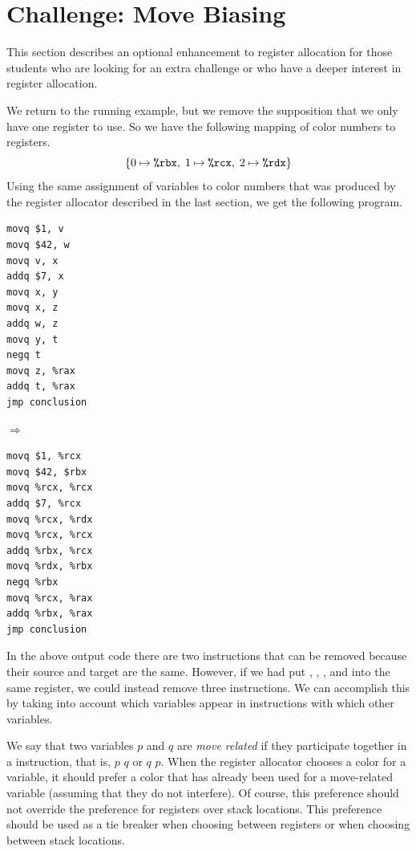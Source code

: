 \documentclass[11pt]{book}
\begin{document}
\section{Challenge: Move Biasing}
\label{sec:move-biasing}

This section describes an optional enhancement to register allocation
for those students who are looking for an extra challenge or who have
a deeper interest in register allocation.

We return to the running example, but we remove the supposition that
we only have one register to use. So we have the following mapping of
color numbers to registers.
\[
  \{ 0 \mapsto \texttt{\%rbx}, \; 1 \mapsto \texttt{\%rcx}, \; 2 \mapsto \texttt{\%rdx} \}
\]
Using the same assignment of variables to color numbers that was
produced by the register allocator described in the last section, we
get the following program.

\begin{minipage}{0.3\textwidth}
\begin{lstlisting}
movq $1, v
movq $42, w
movq v, x
addq $7, x
movq x, y
movq x, z
addq w, z
movq y, t
negq t
movq z, %rax
addq t, %rax
jmp conclusion
\end{lstlisting}
\end{minipage}
$\Rightarrow\qquad$
\begin{minipage}{0.45\textwidth}
\begin{lstlisting}
movq $1, %rcx
movq $42, $rbx
movq %rcx, %rcx
addq $7, %rcx
movq %rcx, %rdx
movq %rcx, %rcx
addq %rbx, %rcx
movq %rdx, %rbx
negq %rbx
movq %rcx, %rax
addq %rbx, %rax
jmp conclusion
\end{lstlisting}
\end{minipage}

In the above output code there are two  instructions that
can be removed because their source and target are the same.  However,
if we had put , , , and  into the same
register, we could instead remove three  instructions.  We
can accomplish this by taking into account which variables appear in
 instructions with which other variables.

We say that two variables $p$ and $q$ are \emph{move related} if they
participate together in a  instruction, that is, 
$p$\key{,} $q$ or  $q$\key{,} $p$. When the register
allocator chooses a color for a variable, it should prefer a color
that has already been used for a move-related variable (assuming that
they do not interfere). Of course, this preference should not override
the preference for registers over stack locations. This preference
should be used as a tie breaker when choosing between registers or
when choosing between stack locations.
\end{document}
